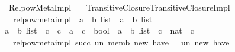 %
\begin{isabellebody}%
%
%
\isadelimdocument
%
\endisadelimdocument
%
\isatagdocument
%
\isamarkuptrue%
%
\endisatagdocument
{\isafolddocument}%
%
\isadelimdocument
%
\endisadelimdocument
%
\isadelimtheory
%
\endisadelimtheory
%
\isatagtheory
{}\isamarkupfalse%
\ Relpow{\isacharunderscore}{\kern0pt}Meta{\isacharunderscore}{\kern0pt}Impl\isanewline
\ \ \ {\isachardoublequoteopen}Transitive{\isacharminus}{\kern0pt}Closure{\isachardot}{\kern0pt}Transitive{\isacharunderscore}{\kern0pt}Closure{\isacharunderscore}{\kern0pt}Impl{\isachardoublequoteclose}\isanewline
{}%
\endisatagtheory
{\isafoldtheory}%
%
\isadelimtheory
\isanewline
%
\endisadelimtheory
\isanewline
{}\isamarkupfalse%
\isanewline
\ \ relpow{\isacharunderscore}{\kern0pt}meta{\isacharunderscore}{\kern0pt}impl\ {\isacharcolon}{\kern0pt}{\isacharcolon}{\kern0pt}\ {\isachardoublequoteopen}{\isacharparenleft}{\kern0pt}{\isacharparenleft}{\kern0pt}{\isacharprime}{\kern0pt}a\ {\isacharasterisk}{\kern0pt}\ {\isacharprime}{\kern0pt}b{\isacharparenright}{\kern0pt}\ list\ {\isasymRightarrow}\ {\isacharparenleft}{\kern0pt}{\isacharprime}{\kern0pt}a\ {\isacharasterisk}{\kern0pt}\ {\isacharprime}{\kern0pt}b{\isacharparenright}{\kern0pt}\ list\ {\isacharparenright}{\kern0pt}\ {\isasymRightarrow}\isanewline
{\isacharparenleft}{\kern0pt}{\isacharparenleft}{\kern0pt}{\isacharprime}{\kern0pt}a\ {\isacharasterisk}{\kern0pt}\ {\isacharprime}{\kern0pt}b{\isacharparenright}{\kern0pt}\ list\ {\isasymRightarrow}\ {\isacharprime}{\kern0pt}c\ {\isasymRightarrow}\ {\isacharprime}{\kern0pt}c{\isacharparenright}{\kern0pt}\ {\isasymRightarrow}\ {\isacharparenleft}{\kern0pt}{\isacharprime}{\kern0pt}a\ {\isasymRightarrow}\ {\isacharprime}{\kern0pt}c\ {\isasymRightarrow}\ bool{\isacharparenright}{\kern0pt}\ {\isasymRightarrow}\ {\isacharparenleft}{\kern0pt}{\isacharprime}{\kern0pt}a\ {\isacharasterisk}{\kern0pt}\ {\isacharprime}{\kern0pt}b{\isacharparenright}{\kern0pt}\ list\ {\isasymRightarrow}\ {\isacharprime}{\kern0pt}c\ {\isasymRightarrow}\ nat\ {\isasymRightarrow}\ {\isacharprime}{\kern0pt}c{\isachardoublequoteclose}\isanewline
{}\isanewline
\ \ {\isachardoublequoteopen}relpow{\isacharunderscore}{\kern0pt}meta{\isacharunderscore}{\kern0pt}impl\ succ\ un\ memb\ new\ have\ {}\ {\isacharequal}{\kern0pt}\ un\ new\ have{\isachardoublequoteclose}\ {\isacharbar}{\kern0pt}\isanewline

\end{isabellebody}
